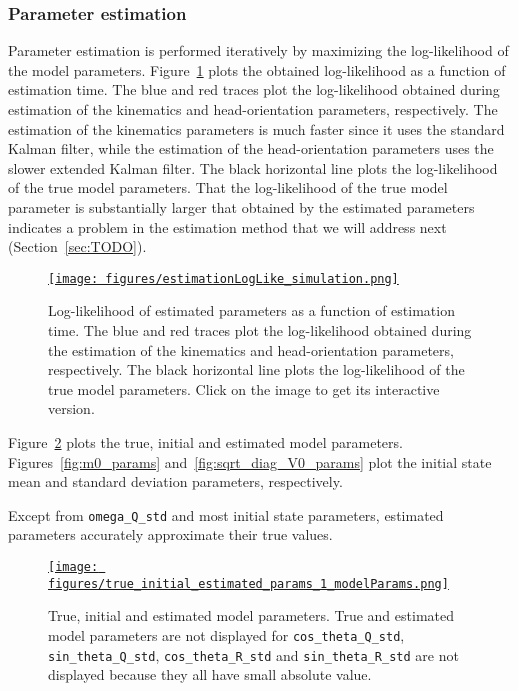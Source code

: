 \documentclass[12pt]{article}
\begin{document}
\subsubsection*{Parameter estimation}

Parameter estimation is performed iteratively by maximizing the log-likelihood
of the model parameters. Figure~\ref{fig:sim_logLike} plots the obtained
log-likelihood as a function of estimation time. The blue and red traces plot the
log-likelihood obtained during estimation of the kinematics and
head-orientation parameters, respectively.
%
The estimation of the kinematics parameters is much faster since it uses the
standard Kalman filter, while the estimation of the head-orientation parameters
uses the slower extended Kalman filter. The black horizontal line plots the
log-likelihood of the true model parameters.
%
That the log-likelihood of the true model parameter is substantially larger
that obtained by the estimated parameters indicates a problem in the estimation
method that we will address next (Section~\ref{sec:TODO}).

\begin{figure}
    \centering
    \href{https://www.gatsby.ucl.ac.uk/~rapela/aman/reports/ekfForKinematicsAndHeadOrientation/figures/estimationLogLike_simulation.html}{\texttt{[image: figures/estimationLogLike\_simulation.png]}}
    \caption{Log-likelihood of estimated parameters as a function of estimation
    time. The blue and red traces plot the log-likelihood obtained during the
    estimation of the kinematics and head-orientation parameters, respectively.
    The black horizontal line plots the log-likelihood of the true model
    parameters. Click on the image to get its interactive version.}
    \label{fig:sim_logLike}
\end{figure}

Figure~\ref{fig:model_params} plots the true, initial and estimated model
parameters. Figures~\ref{fig:m0_params}
and~\ref{fig:sqrt_diag_V0_params} plot the initial
state mean and standard deviation parameters, respectively.

Except from \texttt{omega\_Q\_std} and most initial state parameters, estimated
parameters accurately approximate their true values.

\begin{figure}
    \centering
    \href{https://www.gatsby.ucl.ac.uk/~rapela/aman/reports/ekfForKinematicsAndHeadOrientation/figures/true_initial_estimated_params_1_modelParams.png}{\texttt{[image: figures/true\_initial\_estimated\_params\_1\_modelParams.png]}}

    \caption{True, initial and estimated model parameters.  True and estimated
    model parameters are not displayed for \texttt{cos\_theta\_Q\_std},
    \texttt{sin\_theta\_Q\_std}, \texttt{cos\_theta\_R\_std} and
    \texttt{sin\_theta\_R\_std} are not displayed because they all have small
    absolute value.}

    \label{fig:model_params}
\end{figure}
\end{document}
